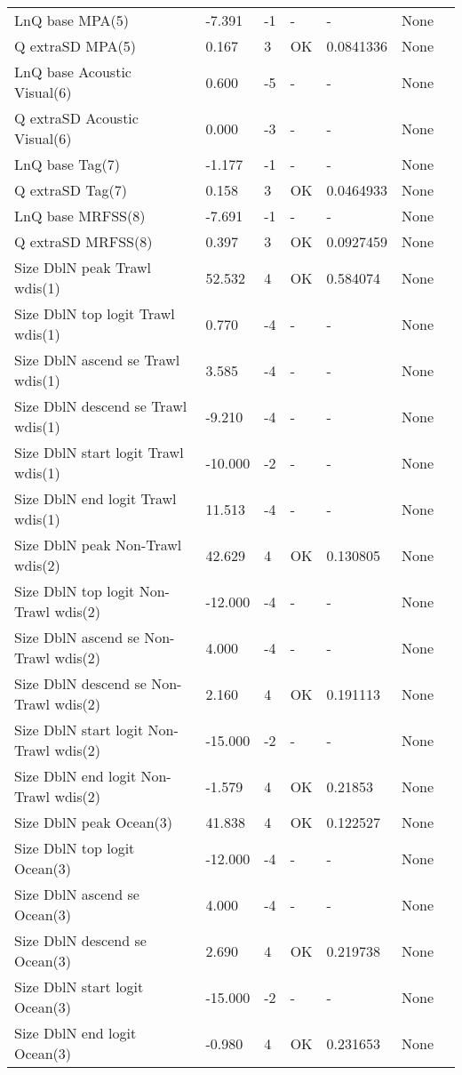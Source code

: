 \documentclass[11pt,
  english,
  letterpaper,
]{article}
\begin{document}
\begin{landscape}
\begin{longtable}[t]{>{\raggedright\arraybackslash}p{6cm}lllll>{\raggedright\arraybackslash}p{4cm}}
LnQ base MPA(5) & -7.391 & -1 & - & - & None\\
Q extraSD MPA(5) & 0.167 & 3 & OK & 0.0841336 & None\\
LnQ base Acoustic Visual(6) & 0.600 & -5 & - & - & None\\
Q extraSD Acoustic Visual(6) & 0.000 & -3 & - & - & None\\
LnQ base Tag(7) & -1.177 & -1 & - & - & None\\
Q extraSD Tag(7) & 0.158 & 3 & OK & 0.0464933 & None\\
LnQ base MRFSS(8) & -7.691 & -1 & - & - & None\\
Q extraSD MRFSS(8) & 0.397 & 3 & OK & 0.0927459 & None\\
Size DblN peak Trawl wdis(1) & 52.532 & 4 & OK & 0.584074 & None\\
Size DblN top logit Trawl wdis(1) & 0.770 & -4 & - & - & None\\
Size DblN ascend se Trawl wdis(1) & 3.585 & -4 & - & - & None\\
Size DblN descend se Trawl wdis(1) & -9.210 & -4 & - & - & None\\
Size DblN start logit Trawl wdis(1) & -10.000 & -2 & - & - & None\\
Size DblN end logit Trawl wdis(1) & 11.513 & -4 & - & - & None\\
Size DblN peak Non-Trawl wdis(2) & 42.629 & 4 & OK & 0.130805 & None\\
Size DblN top logit Non-Trawl wdis(2) & -12.000 & -4 & - & - & None\\
Size DblN ascend se Non-Trawl wdis(2) & 4.000 & -4 & - & - & None\\
Size DblN descend se Non-Trawl wdis(2) & 2.160 & 4 & OK & 0.191113 & None\\
Size DblN start logit Non-Trawl wdis(2) & -15.000 & -2 & - & - & None\\
Size DblN end logit Non-Trawl wdis(2) & -1.579 & 4 & OK & 0.21853 & None\\
Size DblN peak Ocean(3) & 41.838 & 4 & OK & 0.122527 & None\\
Size DblN top logit Ocean(3) & -12.000 & -4 & - & - & None\\
Size DblN ascend se Ocean(3) & 4.000 & -4 & - & - & None\\
Size DblN descend se Ocean(3) & 2.690 & 4 & OK & 0.219738 & None\\
Size DblN start logit Ocean(3) & -15.000 & -2 & - & - & None\\
Size DblN end logit Ocean(3) & -0.980 & 4 & OK & 0.231653 & None\\

\end{longtable}
\end{landscape}
\end{document}
